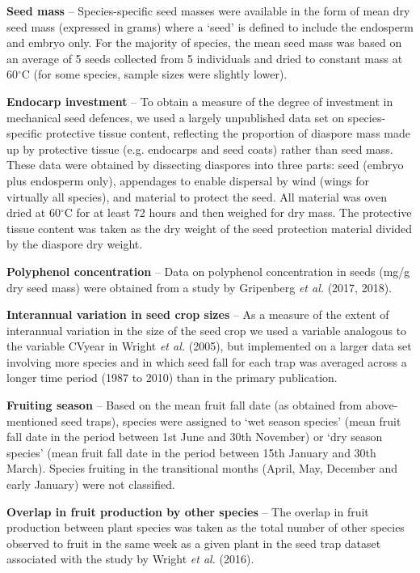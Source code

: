 \documentclass[11pt]{article}
\begin{document}
\textbf{Seed mass} – Species-specific seed masses were available in the form of mean dry seed mass (expressed in grams) where a `seed' is defined to include the endosperm and embryo only. For the majority of species, the mean seed mass was based on an average of 5 seeds collected from 5 individuals and dried to constant mass at 60$^{\circ}$C (for some species, sample sizes were slightly lower). 

\textbf{Endocarp investment} – To obtain a measure of the degree of investment in mechanical seed defences, we used a largely unpublished data set on species-specific protective tissue content, reflecting the proportion of diaspore mass made up by protective tissue (e.g. endocarps and seed coats) rather than seed mass. These data were obtained by dissecting diaspores into three parts: seed (embryo plus endosperm only), appendages to enable dispersal by wind (wings for virtually all species), and material to protect the seed. All material was oven dried at 60$^{\circ}$C for at least 72 hours and then weighed for dry mass. The protective tissue content was taken as the dry weight of the seed protection material divided by the diaspore dry weight.

\textbf{Polyphenol concentration} – Data on polyphenol concentration in seeds (mg/g dry seed mass) were obtained from a study by Gripenberg \emph{et al. }(2017, 2018).

\textbf{Interannual variation in seed crop sizes} – As a measure of the extent of interannual variation in the size of the seed crop we used a variable analogous to the variable CVyear in Wright \emph{et al. }(2005), but implemented on a larger data set involving more species and in which seed fall for each trap was averaged across a longer time period (1987 to 2010) than in the primary publication. 

\textbf{Fruiting season }– Based on the mean fruit fall date (as obtained from above-mentioned seed traps), species were assigned to ‘wet season species’ (mean fruit fall date in the period between 1st June and 30th November) or ‘dry season species’ (mean fruit fall date in the period between 15th January and 30th March). Species fruiting in the transitional months (April, May, December and early January) were not classified.

\textbf{Overlap in fruit production by other species} – The overlap in fruit production between plant species was taken as the total number of other species observed to fruit in the same week as a given plant in the seed trap dataset associated with the study by Wright \emph{et al. }(2016).
\end{document}
